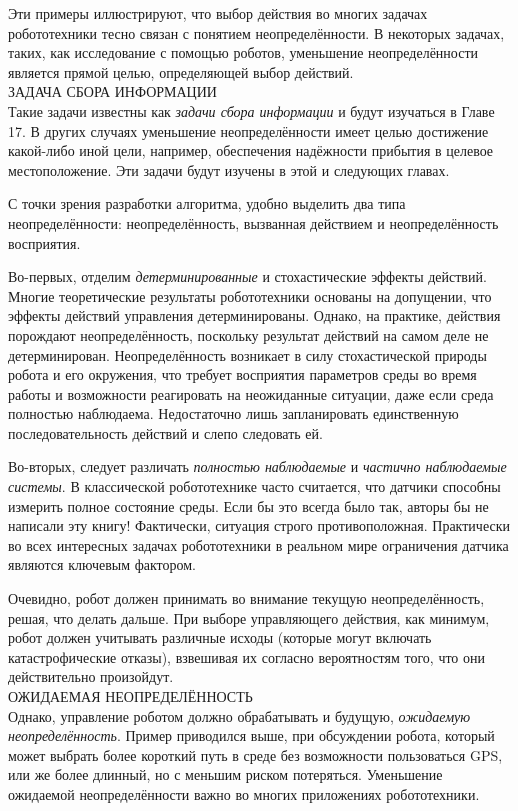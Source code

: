\documentclass[10pt,a4paper]{article}
\begin{document}
Эти примеры иллюстрируют, что выбор действия во многих задачах робототехники тесно связан с понятием неопределённости. В некоторых задачах, таких, как исследование с помощью роботов, уменьшение неопределённости является прямой целью, определяющей выбор действий.\\ 

ЗАДАЧА СБОРА ИНФОРМАЦИИ\\
Такие задачи известны как \textit{задачи сбора информации} и будут изучаться в Главе 17.
В других случаях уменьшение неопределённости имеет целью достижение какой-либо иной цели, например, обеспечения надёжности прибытия в целевое местоположение. Эти задачи будут изучены в этой и следующих главах.

С точки зрения разработки алгоритма, удобно выделить два типа неопределённости: неопределённость, вызванная действием и неопределённость восприятия.

Во-первых, отделим \textit{детерминированные} и стохастические эффекты действий. Многие теоретические результаты робототехники основаны на допущении, что эффекты действий управления детерминированы. Однако, на практике, действия порождают неопределённость, поскольку результат действий на самом деле не детерминирован. Неопределённость возникает в силу стохастической природы робота и его окружения, что требует восприятия параметров среды во время работы и возможности реагировать на неожиданные ситуации, даже если среда полностью наблюдаема. Недостаточно лишь запланировать единственную последовательность действий и слепо следовать ей.

Во-вторых, следует различать \textit{полностью наблюдаемые} и \textit{частично наблюдаемые системы}. В классической робототехнике часто считается, что датчики способны измерить полное состояние среды. Если бы это всегда было так, авторы бы не написали эту книгу! Фактически, ситуация строго противоположная. Практически во всех интересных задачах робототехники в реальном мире ограничения датчика являются ключевым фактором.

Очевидно, робот должен принимать во внимание текущую неопределённость, решая, что делать дальше. При выборе управляющего действия, как минимум, робот должен учитывать различные исходы (которые могут включать катастрофические отказы), взвешивая их согласно вероятностям того, что они действительно произойдут.\\

ОЖИДАЕМАЯ НЕОПРЕДЕЛЁННОСТЬ\\
Однако, управление роботом должно обрабатывать и будущую, \textit{ожидаемую неопределённость}. Пример приводился выше, при обсуждении робота, который может выбрать более короткий путь в среде без возможности пользоваться GPS, или же более длинный, но с меньшим риском потеряться. Уменьшение ожидаемой неопределённости важно во многих приложениях робототехники.
\end{document}
